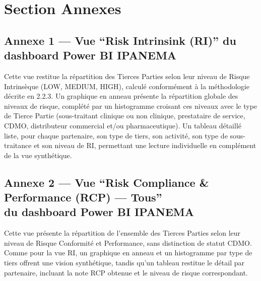\clearpage
\chapter*{Section Annexes}

\section*{Annexe 1 — Vue ``Risk Intrinsink (RI)'' du dashboard Power BI IPANEMA}

Cette vue restitue la répartition des Tierces Parties selon leur niveau de Risque
Intrinsèque (LOW, MEDIUM, HIGH), calculé conformément à la méthodologie décrite en
2.2.3. Un graphique en anneau présente la répartition globale des niveaux de risque,
complété par un histogramme croisant ces niveaux avec le type de Tierce Partie
(sous-traitant clinique ou non clinique, prestataire de service, CDMO, distributeur
commercial et/ou pharmaceutique). Un tableau détaillé liste, pour chaque partenaire, son
type de tiers, son activité, son type de sous-traitance et son niveau de RI, permettant une
lecture individuelle en complément de la vue synthétique.

\begin{figure}[H]
    \centering
    \label{fig:annexe1_risk_intrinsink}
\end{figure}

\section*{Annexe 2 — Vue ``Risk Compliance \& Performance (RCP) — Tous''\\du dashboard Power BI IPANEMA}

Cette vue présente la répartition de l'ensemble des Tierces Parties selon leur niveau
de Risque Conformité et Performance, sans distinction de statut CDMO. Comme pour la vue
RI, un graphique en anneau et un histogramme par type de tiers offrent une vision
synthétique, tandis qu'un tableau restitue le détail par partenaire, incluant la note RCP
obtenue et le niveau de risque correspondant.

\begin{figure}[H]
    \centering
    \label{fig:annexe2_rcp_tous}
\end{figure}

